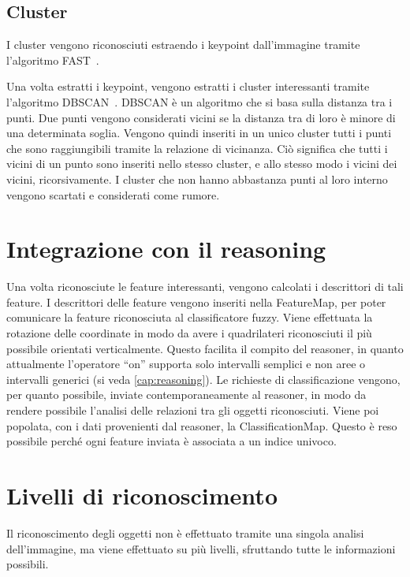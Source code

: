 \subsection{Cluster}

I cluster vengono riconosciuti estraendo i keypoint dall'immagine tramite l'algoritmo FAST~\cite{rosten_2006_machine}.


Una volta estratti i keypoint, vengono estratti i cluster interessanti tramite l'algoritmo DBSCAN~\cite{ester1996density}.
DBSCAN è un algoritmo che si basa sulla distanza tra i punti. Due punti vengono considerati vicini se la distanza tra di loro è minore di una determinata soglia. Vengono quindi inseriti in un unico cluster tutti i punti che sono raggiungibili tramite la relazione di vicinanza. Ciò significa che tutti i vicini di un punto sono inseriti nello stesso cluster, e allo stesso modo i vicini dei vicini, ricorsivamente.
I cluster che non hanno abbastanza punti al loro interno vengono scartati e considerati come rumore.

\section{Integrazione con il reasoning}
Una volta riconosciute le feature interessanti, vengono calcolati i descrittori di tali feature. I descrittori delle feature vengono inseriti nella FeatureMap, per poter comunicare la feature riconosciuta al classificatore fuzzy.
Viene effettuata la rotazione delle coordinate in modo da avere i quadrilateri riconosciuti il più possibile orientati verticalmente. Questo facilita il compito del reasoner, in quanto attualmente l'operatore ``on'' supporta solo intervalli semplici e non aree o intervalli generici (si veda \autoref{cap:reasoning}).
Le richieste di classificazione vengono, per quanto possibile, inviate contemporaneamente al reasoner, in modo da rendere possibile l'analisi delle relazioni tra gli oggetti riconosciuti. Viene poi popolata, con i dati provenienti dal reasoner, la ClassificationMap. Questo è reso possibile perché ogni feature inviata è associata a un indice univoco.


\section{Livelli di riconoscimento}
Il riconoscimento degli oggetti non è effettuato tramite una singola analisi dell'immagine, ma viene effettuato su più livelli, sfruttando tutte le informazioni possibili.

